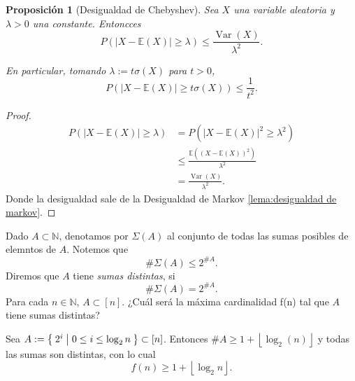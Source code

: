\documentclass[12pt]{report}
\theoremstyle{plain}
\newtheorem{proposition}[theorem]{Proposición}
\theoremstyle{definition}
\newcommand{\naturals}{\mathbb{N}}
\newcommand{\abs}[1]{\left \vert #1 \right \vert}
\newcommand{\floor}[1]{\left\lfloor #1  \right\rfloor}
\begin{document}
\begin{proposition}[Desigualdad de Chebyshev]\label{proposition:desigualdad de Chebyshev}
Sea $X$ una variable aleatoria y $\lambda > 0$ una constante. Entoncces
\[
    P(\abs{X - \mathbb{E}(X)} \geq \lambda) \leq \frac{\operatorname{Var}(X)}{\lambda^2}.
\]

En particular, tomando $\lambda := t \sigma (X)$ para $t > 0$,
\[
    P(\abs{X - \mathbb{E}(X)} \geq t \sigma (X)) \leq \frac{1}{t^2}.
\]
\end{proposition}
\begin{proof}
\begin{align*}
P(\abs{X - \mathbb{E}(X)} \geq \lambda)  &= P (\abs{X - \mathbb{E}(X)}^2 \geq \lambda^2) \\
&\leq \frac{\mathbb{E} ((X- \mathbb{E}(X))^2)}{\lambda^2} \\
&= \frac{\operatorname{Var}(X)}{\lambda^2}.
\end{align*}
Donde la desigualdad sale de la Desigualdad de Markov \ref{lema:desigualdad de markov}.
\end{proof}


\bigskip



Dado $A \subset \naturals$, denotamos por $\Sigma (A)$ al conjunto de todas las sumas posibles de elemntos de $A$. Notemos que
\[
    \#\Sigma (A) \leq 2^{\# A}.
\]
Diremos que $A$ tiene \textit{sumas distintas}, si
\[
    \# \Sigma (A) = 2^{\# A}.
\]
Para cada $n \in \naturals$, $A \subset [n]$. ¿Cuál será la máxima cardinalidad f(n) tal que $A$ tiene sumas distintas?

Sea $A := \Set{2^i | 0 \leq i \leq \log _2 n} \subset [n]$. Entonces $\# A \geq 1 + \floor{\log_2 (n)}$ y todas las sumas son distintas, con lo cual
\[
    f(n) \geq 1 + \floor{\log _2 n}.
\]
\end{document}
